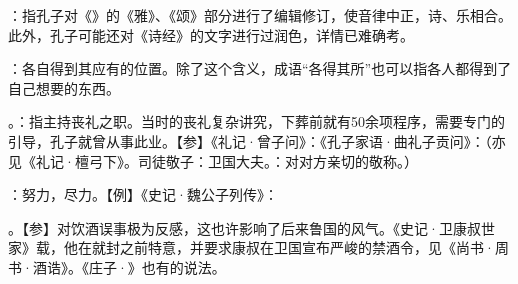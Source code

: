 {
\item {}：指孔子对《》的《雅》、《颂》部分进行了编辑修订，使音律中正，诗、乐相合。此外，孔子可能还对《诗经》的文字进行过润色，详情已难确考。
\item {}：各自得到其应有的位置。除了这个含义，成语“各得其所”也可以指各人都得到了自己想要的东西。
}
{}


{
\item {}。：指主持丧礼之职。当时的丧礼复杂讲究，下葬前就有50余项程序，需要专门的引导，孔子就曾从事此业。【参】《礼记·曾子问》：《孔子家语·曲礼子贡问》：（亦见《礼记·檀弓下》。司徒敬子：卫国大夫。：对对方亲切的敬称。）

：努力，尽力。【例】《史记·魏公子列传》：
\item {}。【参】对饮酒误事极为反感，这也许影响了后来鲁国的风气。《史记·卫康叔世家》载，他在就封之前特意，并要求康叔在卫国宣布严峻的禁酒令，见《尚书·周书·酒诰》。《庄子·》也有的说法。
}
{}


